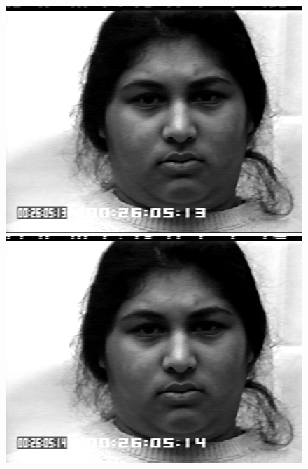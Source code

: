 \documentclass[12pt, a4paper]{report}
\begin{document}
\begin{figure}[h]
	\begin{minipage}[b]{.2\linewidth} %
		\includegraphics[width=\linewidth]{Bilder/Disgust1.png}
	\end{minipage}
	\hspace{.025\linewidth}%
	\begin{minipage}[b]{.2\linewidth} %
		\includegraphics[width=\linewidth]{Bilder/Disgust2.png}
	\end{minipage}
	\hspace{.025\linewidth}%
	\begin{minipage}[b]{.2\linewidth} %

\end{minipage}
\end{figure}
\end{document}
